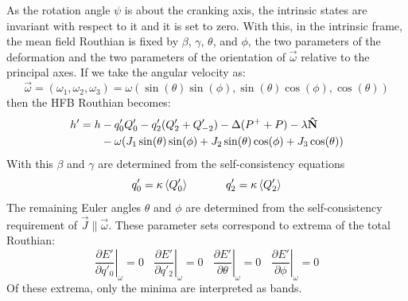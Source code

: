 As the rotation angle $\psi$ is about the cranking axis, the intrinsic states are invariant with respect to it and it is set to zero. With this, in the intrinsic frame, the mean field Routhian is fixed by $\beta$, $\gamma$, $\theta$, and $\phi$, the two parameters of the deformation and the two parameters of the orientation of $\vec{\omega}$ relative to the principal axes. If we take the angular velocity as:
\begin{equation}
\label{eqn:chp2-ang-vel-vec}
\vec{\omega}=(\omega_1,\omega_2,\omega_3)=\omega(\sin(\theta)\sin(\phi),\sin(\theta)\cos(\phi),\cos(\theta))
\end{equation}
then the HFB Routhian becomes:
\begin{align}
\label{eqn:chp2-TAC-HFB-intrin-routh-rewrite}
h'=h& -q'_0Q'_0-q'_2(Q'_2+Q'_{-2})-\Delta(P^++P)-\lambda\boldsymbol{\hat{\textbf{N}}} \\
&- \omega(J_1\sin(\theta)\sin(\phi)+J_2\sin(\theta)\cos(\phi)+J_3\cos(\theta)) \nonumber
\end{align}
With this $\beta$ and $\gamma$ are determined from the self-consistency equations
\begin{equation}
\label{eqn:chp2-TAC-beta-gamma-self-consist}
q'_0=\kappa\Braket{Q'_0}~~~~~~~~~~q'_2=\kappa\Braket{Q'_2}
\end{equation}
The remaining Euler angles $\theta$ and $\phi$ are determined from the self-consistency requirement of $\vec{J}\parallel\vec{\omega}$. These parameter sets correspond to extrema of the total Routhian:
\begin{equation}
\label{eqn:chp2-tac-extrema-cond2}
\left. \frac{\partial{}E'}{\partial{}q'_{0}} \right|_{\omega}=0 ~~~~ \left. \frac{\partial{}E'}{\partial{}q'_{2}} \right|_{\omega}=0 ~~~~ \left. \frac{\partial{}E'}{\partial\theta} \right|_{\omega}=0 ~~~~ \left. \frac{\partial{}E'}{\partial\phi} \right|_{\omega}=0
\end{equation}
Of these extrema, only the minima are interpreted as bands.

